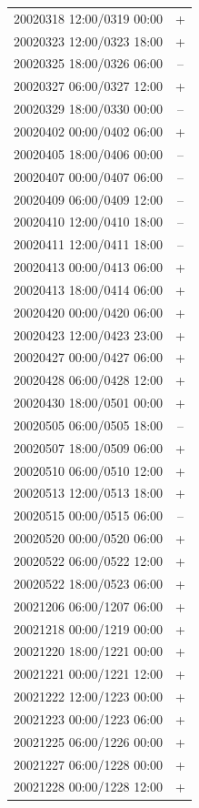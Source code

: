 \documentclass[linenumbers,draft]{agujournal}
\begin{document}
\begin{center}
\begin{longtable}{lc}
20020318 12:00/0319 00:00 & + \\
20020323 12:00/0323 18:00 & + \\
20020325 18:00/0326 06:00 & -- \\
20020327 06:00/0327 12:00 & + \\
20020329 18:00/0330 00:00 & -- \\
20020402 00:00/0402 06:00 & + \\
20020405 18:00/0406 00:00 & -- \\
20020407 00:00/0407 06:00 & -- \\
20020409 06:00/0409 12:00 & -- \\
20020410 12:00/0410 18:00 & -- \\
20020411 12:00/0411 18:00 & -- \\
20020413 00:00/0413 06:00 & + \\
20020413 18:00/0414 06:00 & + \\
20020420 00:00/0420 06:00 & + \\
20020423 12:00/0423 23:00 & + \\
20020427 00:00/0427 06:00 & + \\
20020428 06:00/0428 12:00 & + \\
20020430 18:00/0501 00:00 & + \\
20020505 06:00/0505 18:00 & -- \\
20020507 18:00/0509 06:00 & + \\
20020510 06:00/0510 12:00 & + \\
20020513 12:00/0513 18:00 & + \\
20020515 00:00/0515 06:00 & -- \\
20020520 00:00/0520 06:00 & + \\
20020522 06:00/0522 12:00 & + \\
20020522 18:00/0523 06:00 & + \\
20021206 06:00/1207 06:00 & + \\
20021218 00:00/1219 00:00 & + \\
20021220 18:00/1221 00:00 & + \\
20021221 00:00/1221 12:00 & + \\
20021222 12:00/1223 00:00 & + \\
20021223 00:00/1223 06:00 & + \\
20021225 06:00/1226 00:00 & + \\
20021227 06:00/1228 00:00 & + \\
20021228 00:00/1228 12:00 & + \\

\end{longtable}
\end{center}
\end{document}
